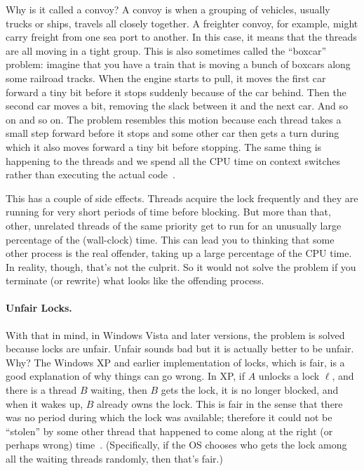 Why is it called a convoy? A convoy is when a grouping of vehicles, usually trucks or ships, travels all closely together. A freighter convoy, for example, might carry freight from one sea port to another. In this case, it means that the threads are all moving in a tight group. This is also sometimes called the ``boxcar'' problem: imagine that you have a train that is moving a bunch of boxcars along some railroad tracks. When the engine starts to pull, it moves the first car forward a tiny bit before it stops suddenly because of the car behind. Then the second car moves a bit, removing the slack between it and the next car. And so on and so on. The problem resembles this motion because each thread takes a small step forward before it stops and some other car then gets a turn during which it also moves forward a tiny bit before stopping. The same thing is happening to the threads and we spend all the CPU time on context switches rather than executing the actual code~\cite{boxcar}.

This has a couple of side effects. Threads acquire the lock frequently and they are running for very short periods of time before blocking. But more than that, other, unrelated threads of the same priority get to run for an unusually large percentage of the (wall-clock) time. This can lead you to thinking that some other process is the real offender, taking up a large percentage of the CPU time. In reality, though, that's not the culprit. So it would not solve the problem if you terminate (or rewrite) what looks like the offending process. 

\paragraph{Unfair Locks.} With that in mind, in Windows Vista and later versions, the problem is solved because locks are unfair. Unfair sounds bad but it is actually better to be unfair. Why? The Windows XP and earlier implementation of locks, which is fair, is a good explanation of why things can go wrong. In XP, if $A$ unlocks a lock $\ell$, and there is a thread $B$ waiting, then $B$ gets the lock, it is no longer blocked, and when it wakes up, $B$ already owns the lock. This is fair in the sense that there was no period during which the lock was available; therefore it could not be ``stolen'' by some other thread that happened to come along at the right (or perhaps wrong) time~\cite{anticonvoy}. (Specifically, if the OS chooses who gets the lock among all the waiting threads randomly, then that's fair.)

